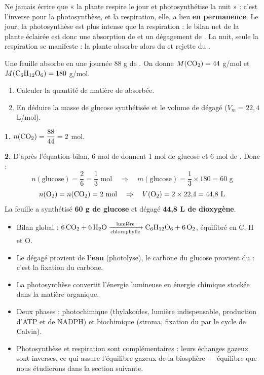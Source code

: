 \documentclass[11pt]{article}
\begin{document}
\begin{attention}
Ne jamais écrire que « la plante respire le jour et photosynthétise la nuit » : c'est l'inverse pour la photosynthèse, et la respiration, elle, a lieu \textbf{en permanence}. Le jour, la photosynthèse est plus intense que la respiration : le bilan net de la plante éclairée est donc une absorption de  et un dégagement de . La nuit, seule la respiration se manifeste : la plante absorbe alors du  et rejette du .
\end{attention}

\begin{exercice}
Une feuille absorbe en une journée 88 g de . On donne $M(\ce{CO2}) = 44$ g/mol et $M(\ce{C6H12O6}) = 180$ g/mol.
\begin{enumerate}
\item Calculer la quantité de matière de  absorbée.
\item En déduire la masse de glucose synthétisée et le volume de  dégagé ($V_m = 22{,}4$ L/mol).
\end{enumerate}
\end{exercice}

\begin{corrige}
\textbf{1.} $n(\ce{CO2}) = \dfrac{88}{44} = 2$ mol.

\textbf{2.} D'après l'équation-bilan, 6 mol de  donnent 1 mol de glucose et 6 mol de . Donc :
\[ n(\text{glucose}) = \frac{2}{6} = \frac{1}{3} \text{ mol} \quad \Rightarrow \quad m(\text{glucose}) = \frac{1}{3} \times 180 = 60 \text{ g} \]
\[ n(\ce{O2}) = n(\ce{CO2}) = 2 \text{ mol} \quad \Rightarrow \quad V(\ce{O2}) = 2 \times 22{,}4 = 44{,}8 \text{ L} \]
La feuille a synthétisé \textbf{60 g de glucose} et dégagé \textbf{44,8 L de dioxygène}.
\end{corrige}

\begin{aretenir}
\begin{itemize}
\item Bilan global : $\ce{6CO2 + 6H2O ->[$\text{lumière}$][\text{chlorophylle}] C6H12O6 + 6O2}$, équilibré en C, H et O.
\item Le  dégagé provient de \textbf{l'eau} (photolyse), le carbone du glucose provient du \textbf{} : c'est la fixation du carbone.
\item La photosynthèse convertit l'énergie lumineuse en énergie chimique stockée dans la matière organique.
\item Deux phases : photochimique (thylakoïdes, lumière indispensable, production d'ATP et de NADPH) et biochimique (stroma, fixation du  par le cycle de Calvin).
\item Photosynthèse et respiration sont complémentaires : leurs échanges gazeux sont inverses, ce qui assure l'équilibre gazeux de la biosphère — équilibre que nous étudierons dans la section suivante.
\end{itemize}
\end{aretenir}
\end{document}
